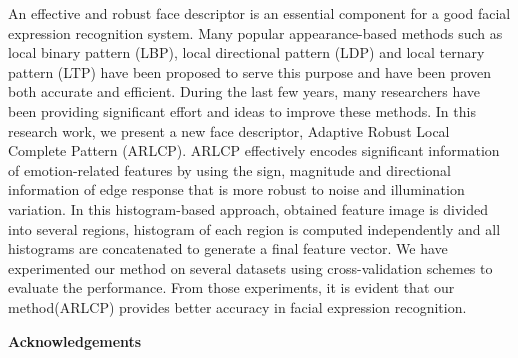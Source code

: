 \documentclass[12pt]{article}
\begin{document}
An effective and robust face descriptor is an essential component for a good facial expression recognition system. Many popular appearance-based methods such as local binary pattern (LBP), local directional pattern
(LDP) and local ternary pattern (LTP) have been proposed to serve this purpose and have been proven both accurate and
efficient. During the last few years, many researchers have been providing significant effort and ideas to improve these methods. In this research work, we present a new face descriptor, Adaptive Robust Local Complete Pattern (ARLCP). ARLCP  effectively encodes significant information of emotion-related features by using the sign, magnitude and directional information of edge response that is more robust to noise and illumination variation. In this histogram-based approach, obtained feature image is divided into several regions, histogram of each region is computed independently and all histograms are concatenated to generate a final feature vector. We have experimented our method on several datasets using cross-validation schemes to evaluate the performance. From those experiments, it is evident that our method(ARLCP) provides better accuracy in facial expression recognition.
\newpage
{}
\begin{LARGE}
\begin{center}
\textbf{Acknowledgements}
\end{center}
\end{LARGE}
\vspace*{0.7cm}
\end{document}
